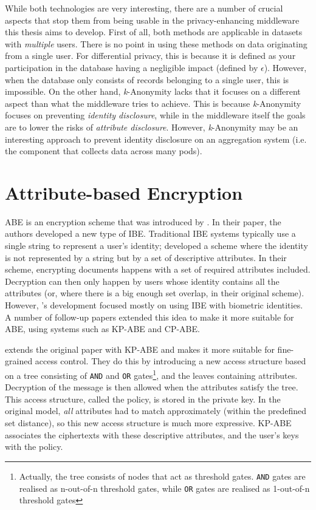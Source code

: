 While both technologies are very interesting, there are a number of crucial aspects that stop them from being usable in the privacy-enhancing middleware this thesis aims to develop. First of all, both methods are applicable in datasets with \textit{multiple} users. There is no point in using these methods on data originating from a single user. For differential privacy, this is because it is defined as your participation in the database having a negligible impact (defined by $\epsilon$). However, when the database only consists of records belonging to a single user, this is impossible. On the other hand, \textit{k}-Anonymity lacks that it focuses on a different aspect than what the middleware tries to achieve. This is because \textit{k}-Anonymity focuses on preventing \textit{identity disclosure}, while in the middleware itself the goals are to lower the risks of \textit{attribute disclosure}. However, \textit{k}-Anonymity may be an interesting approach to prevent identity disclosure on an aggregation system (i.e. the component that collects data across many pods).

\section{Attribute-based Encryption}
\Gls{ABE} is an encryption scheme that was introduced by \citet*{fuzzy-ibe}. In their paper, the authors developed a new type of \gls{IBE}. Traditional \gls{IBE} systems typically use a single string to represent a user's identity; \citeauthor*{fuzzy-ibe} developed a scheme where the identity is not represented by a string but by a set of descriptive attributes. In their scheme, encrypting documents happens with a set of required attributes included. Decryption can then only happen by users whose identity contains all the attributes (or, where there is a big enough set overlap, in their original scheme). However, \citeauthor*{fuzzy-ibe}'s development focused mostly on using \gls{IBE} with biometric identities. A number of follow-up papers extended this idea to make it more suitable for \gls{ABE}, using systems such as \gls{KP-ABE} and \gls{CP-ABE}.

\citet{kp-abe} extends the original paper with \gls{KP-ABE} and makes it more suitable for fine-grained access control. They do this by introducing a new access structure based on a tree consisting of \texttt{AND} and \texttt{OR} gates\footnote{Actually, the tree consists of nodes that act as threshold gates. \texttt{AND} gates are realised as n-out-of-n threshold gates, while \texttt{OR} gates are realised as 1-out-of-n threshold gates}, and the leaves containing attributes. Decryption of the message is then allowed when the attributes satisfy the tree. This access structure, called the policy, is stored in the private key. In the original model, \textit{all} attributes had to match approximately (within the predefined set distance), so this new access structure is much more expressive. \Gls{KP-ABE} associates the ciphertexts with these descriptive attributes, and the user's keys with the policy.

